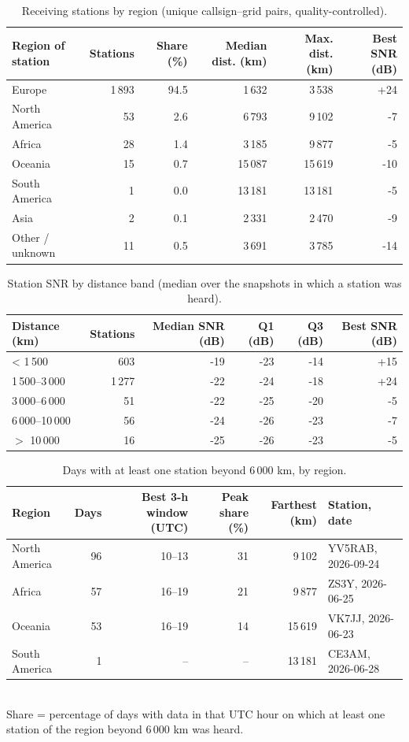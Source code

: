 \begin{table}[htbp]\centering\small
\caption{Receiving stations by region (unique callsign--grid pairs, quality-controlled).}\label{tab:zones}
\begin{tabular}{lrrrrr}
\toprule
Region of station & Stations & Share (\%) & Median dist. (km) & Max. dist. (km) & Best SNR (dB) \\
\midrule
Europe & 1\,893 & 94.5 & 1\,632 & 3\,538 & +24 \\
North America & 53 & 2.6 & 6\,793 & 9\,102 & -7 \\
Africa & 28 & 1.4 & 3\,185 & 9\,877 & -5 \\
Oceania & 15 & 0.7 & 15\,087 & 15\,619 & -10 \\
South America & 1 & 0.0 & 13\,181 & 13\,181 & -5 \\
Asia & 2 & 0.1 & 2\,331 & 2\,470 & -9 \\
Other / unknown & 11 & 0.5 & 3\,691 & 3\,785 & -14 \\
\bottomrule
\end{tabular}
\end{table}

\begin{table}[htbp]\centering\small
\caption{Station SNR by distance band (median over the snapshots in which a station was heard).}\label{tab:snr}
\begin{tabular}{lrrrrr}
\toprule
Distance (km) & Stations & Median SNR (dB) & Q1 (dB) & Q3 (dB) & Best SNR (dB) \\
\midrule
< 1\,500 & 603 & -19 & -23 & -14 & +15 \\
1\,500--3\,000 & 1\,277 & -22 & -24 & -18 & +24 \\
3\,000--6\,000 & 51 & -22 & -25 & -20 & -5 \\
6\,000--10\,000 & 56 & -24 & -26 & -23 & -7 \\
$>$ 10\,000 & 16 & -25 & -26 & -23 & -5 \\
\bottomrule
\end{tabular}
\end{table}

\begin{table}[htbp]\centering\small
\caption{Days with at least one station beyond 6\,000 km, by region.}\label{tab:dxzones}
\begin{tabular}{lrrrrl}
\toprule
Region & Days & Best 3-h window (UTC) & Peak share (\%) & Farthest (km) & Station, date \\
\midrule
North America & 96 & 10--13 & 31 & 9\,102 & YV5RAB, 2026-09-24 \\
Africa & 57 & 16--19 & 21 & 9\,877 & ZS3Y, 2026-06-25 \\
Oceania & 53 & 16--19 & 14 & 15\,619 & VK7JJ, 2026-06-23 \\
South America & 1 & -- & -- & 13\,181 & CE3AM, 2026-06-28 \\
\bottomrule
\end{tabular}
\\[2pt]{\footnotesize Share = percentage of days with data in that UTC hour on which at least one station of the region beyond 6\,000 km was heard.}
\end{table}

